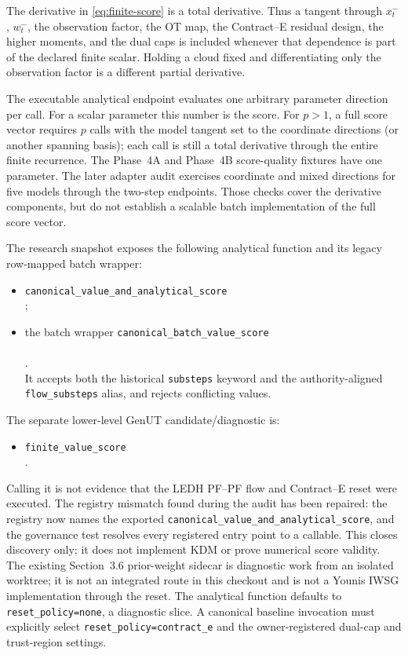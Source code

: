 \documentclass[11pt]{article}
\newcommand{\OT}{\ensuremath{\mathrm{OT}}}
\begin{document}
The derivative in \eqref{eq:finite-score} is a total derivative.  Thus a
tangent through $x_t^{-}$, $w_t^{-}$, the observation factor, the \OT{} map,
the Contract--E residual design, the higher moments, and the dual caps is
included whenever that dependence is part of the declared finite scalar.
Holding a cloud fixed and differentiating only the observation factor is a
different partial derivative.

The executable analytical endpoint evaluates one arbitrary parameter
direction per call.  For a scalar parameter this number is the score.  For
$p>1$, a full score vector requires $p$ calls with the model tangent set to
the coordinate directions (or another spanning basis); each call is still a
total derivative through the entire finite recurrence.  The Phase~4A and Phase~4B score-quality fixtures have one parameter.
The later adapter audit exercises coordinate and mixed directions for five
models through the two-step endpoints. Those checks cover the derivative
components, but do not establish a scalable batch implementation of the full
score vector.

The research snapshot exposes the following analytical function and
its legacy row-mapped batch wrapper:
\begin{itemize}[leftmargin=2em]
  \item \texttt{canonical\_value\_and\_analytical\_score}\\
        ;
  \item the batch wrapper
        \texttt{canonical\_batch\_value\_score}\\
        \\
        .\\
        It accepts both the historical \texttt{substeps} keyword and the
        authority-aligned \texttt{flow\_substeps} alias, and rejects
        conflicting values.
\end{itemize}
The separate lower-level GenUT candidate/diagnostic is:
\begin{itemize}[leftmargin=2em]
  \item \texttt{finite\_value\_score}\\
        .
\end{itemize}
Calling it is not evidence that the LEDH PF--PF flow and Contract--E reset
were executed.  The registry mismatch found during the audit has been repaired:
the registry now names the exported
\texttt{canonical\_value\_and\_analytical\_score}, and the governance test
resolves every registered entry point to a callable.  This closes discovery
only; it does not implement KDM or prove numerical score validity.  The existing
Section~3.6 prior-weight sidecar is diagnostic work from an isolated worktree;
it is not an integrated route in this checkout and is not a Younis IWSG
implementation through the reset.  The analytical function defaults to
\texttt{reset\_policy=none}, a diagnostic slice.  A canonical baseline
invocation must explicitly select \texttt{reset\_policy=contract\_e} and the
owner-registered dual-cap and trust-region settings.
\end{document}
